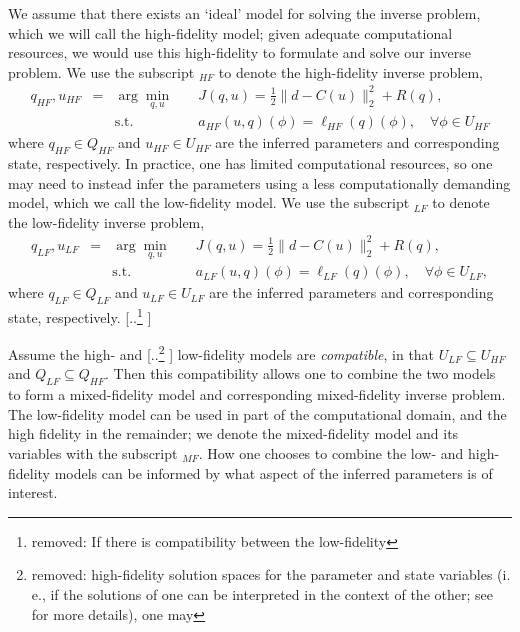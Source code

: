 \documentclass[review,sort&compress]{elsarticle}
\providecommand{\DIFaddtex}[1]{{\protect\color{blue} \sf #1}} %
\providecommand{\DIFdeltex}[1]{{\protect\color{red} [..\footnote{removed: #1} ]}} %
\providecommand{\DIFaddbegin}{} %
\providecommand{\DIFaddend}{} %
\providecommand{\DIFdelbegin}{} %
\providecommand{\DIFdelend}{} %
\providecommand{\DIFadd}[1]{\texorpdfstring{\DIFaddtex{#1}}{#1}} %
\providecommand{\DIFdel}[1]{\texorpdfstring{\DIFdeltex{#1}}{}} %
\newcommand{\DIFscaledelfig}{0.5}
\newlength{\DIFdelgraphicswidth} %
\newlength{\DIFdelgraphicsheight} %
\newcommand{\DIFaddincludegraphics}[2][]{{\color{blue}\fbox{\DIFOincludegraphics[#1]{#2}}}} %
\newcommand{\DIFdelincludegraphics}[2][]{%
\sbox{\DIFdelgraphicsbox}{\DIFOincludegraphics[#1]{#2}}%
\settoboxwidth{\DIFdelgraphicswidth}{\DIFdelgraphicsbox} %
\settoboxtotalheight{\DIFdelgraphicsheight}{\DIFdelgraphicsbox} %
\scalebox{\DIFscaledelfig}{%
\parbox[b]{\DIFdelgraphicswidth}{\usebox{\DIFdelgraphicsbox}\\[-\baselineskip] \rule{\DIFdelgraphicswidth}{0em}}\llap{\resizebox{\DIFdelgraphicswidth}{\DIFdelgraphicsheight}{%
\setlength{\unitlength}{\DIFdelgraphicswidth}%
\begin{picture}(1,1)%
\thicklines\linethickness{2pt} %
{\color[rgb]{1,0,0}\put(0,0){\framebox(1,1){}}}%
{\color[rgb]{1,0,0}\put(0,0){\line( 1,1){1}}}%
{\color[rgb]{1,0,0}\put(0,1){\line(1,-1){1}}}%
\end{picture}%
}\hspace*{3pt}}} %
} %
\DeclareRobustCommand{\DIFaddbegin}{\DIFOaddbegin \let\includegraphics\DIFaddincludegraphics} %
\DeclareRobustCommand{\DIFaddend}{\DIFOaddend \let\includegraphics\DIFOincludegraphics} %
\DeclareRobustCommand{\DIFdelbegin}{\DIFOdelbegin \let\includegraphics\DIFdelincludegraphics} %
\DeclareRobustCommand{\DIFdelend}{\DIFOaddend \let\includegraphics\DIFOincludegraphics} %
\begin{document}
We assume that there exists an `ideal' model for solving the inverse problem, which we will call the high-fidelity model; given adequate computational resources, we would use this high-fidelity to formulate and solve our inverse problem. We use the subscript $_{HF}$ to denote the high-fidelity inverse problem,
%
\begin{subequations}
\label{eq:invOptHF}
\begin{align}
q_{HF},u_{HF} &=&\arg\min\limits_{q,u} & \quad J(q,u)=\frac{1}{2}\|d-C(u)\|_2^2 + R(q), \label{eq:invOpt_objHF} \\
&&\textrm{s.t. }& \quad a_{HF}(u,q)(\phi)=\ell_{HF}(q)(\phi),\quad\forall\phi\in U_{HF} \label{eq:invOpt_consHF}
\end{align}
\end{subequations}
%
where $q_{HF} \in Q_{HF}$ and $u_{HF}\in U_{HF}$ are the inferred parameters and corresponding state, respectively. In practice, one has limited computational resources, so one may need to instead infer the parameters using a less computationally demanding model, which we call the low-fidelity model. We use the subscript $_{LF}$ to denote the low-fidelity inverse problem,
%
\begin{subequations}
\label{eq:invOptLF}
\begin{align}
q_{LF},u_{LF} &=& \arg\min\limits_{q,u} & \quad J(q,u)=\frac{1}{2}\|d-C(u)\|_2^2 + R(q), \label{eq:invOpt_objLF} \\
&& \textrm{s.t. }& \quad a_{LF}(u,q)(\phi)=\ell_{LF}(q)(\phi),\quad\forall\phi\in U_{LF}, \label{eq:invOpt_consLF}
\end{align}
\end{subequations}
%
where $q_{LF} \in Q_{LF}$ and $u_{LF}\in U_{LF}$ are the inferred parameters and corresponding state, respectively. 
\DIFdelbegin \DIFdel{If there is compatibility between the low-fidelity }\DIFdelend \DIFaddbegin 

\DIFadd{Assume the high- }\DIFaddend and \DIFdelbegin \DIFdel{high-fidelity solution spaces for the parameter and state variables (i. e., if the solutions of one can be interpreted in the context of the other; see \Cref{sec:adapt_alg} for more details), one may }\DIFdelend \DIFaddbegin \DIFadd{low-fidelity models are \emph{compatible}, in that $U_{LF}\subseteq U_{HF}$ and $Q_{LF}\subseteq Q_{HF}$. Then this compatibility allows one to }\DIFaddend combine the two models to form a mixed-fidelity model and corresponding mixed-fidelity inverse problem. The low-fidelity model can be used in part of the computational domain, and the high fidelity in the remainder; we denote the mixed-fidelity model and its variables with the subscript $_{MF}$. How one chooses to combine the low- and high-fidelity models can be informed by what aspect of the inferred parameters is of interest.
\end{document}
